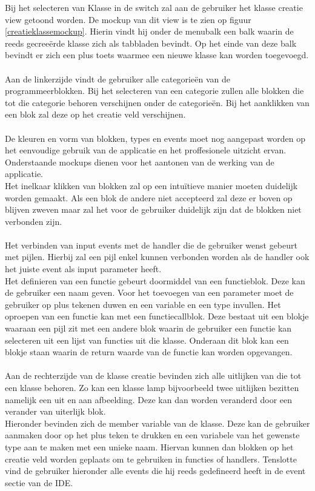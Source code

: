 \documentclass[]{article}
\begin{document}
Bij het selecteren van Klasse in de switch zal aan de gebruiker het klasse creatie view getoond worden. De mockup van dit view is te zien op figuur \ref{creatieklassemockup}. Hierin vindt hij onder de menubalk een balk waarin de reeds gecree\"{e}rde klasse zich als tabbladen bevindt. Op het einde van deze balk bevindt er zich een plus toets waarmee een nieuwe klasse kan worden toegevoegd.\\\\Aan de linkerzijde vindt de gebruiker alle categorie\"{e}n van de programmeerblokken. Bij het selecteren van een categorie zullen alle blokken die tot die categorie behoren verschijnen onder de categorie\"{e}n. Bij het aanklikken van een blok zal deze op het creatie veld verschijnen.\\\\ De kleuren en vorm van blokken, types en events moet nog aangepast worden op het eenvoudige gebruik van de applicatie en het proffesionele uitzicht ervan. Onderstaande mockups dienen voor het aantonen van de werking van de applicatie.\\ Het inelkaar klikken van blokken zal op een intu\"{i}tieve manier moeten duidelijk worden gemaakt. Als een blok de andere niet accepteerd zal deze er boven op blijven zweven maar zal het voor de gebruiker duidelijk zijn dat de blokken niet verbonden zijn.\\\\ Het verbinden van input events met de handler die de gebruiker wenst gebeurt met pijlen. Hierbij zal een pijl enkel kunnen verbonden worden als de handler ook het juiste event als input parameter heeft.\\ Het definieren van een functie gebeurt doormiddel van een functieblok. Deze kan de gebruiker een naam geven. Voor het toevoegen van een parameter moet de gebruiker op plus tekenen duwen en een variable en een type invullen. Het oproepen van een functie kan met een functiecallblok. Deze bestaat uit een blokje waaraan een pijl zit met een andere blok waarin de gebruiker een functie kan selecteren uit een lijst van functies uit die klasse. Onderaan dit blok kan een blokje staan waarin de return waarde van de functie kan worden opgevangen.\\\\ Aan de rechterzijde van de klasse creatie bevinden zich alle uitlijken van die tot een klasse behoren. Zo kan een klasse lamp bijvoorbeeld twee uitlijken bezitten namelijk een uit en aan afbeelding. Deze kan dan worden veranderd door een verander van uiterlijk blok.\\Hieronder bevinden zich de member variable van de klasse. Deze kan de gebruiker aanmaken door op het plus teken te drukken en een variabele van het gewenste type aan te maken met een unieke naam. Hiervan kunnen dan blokken op het creatie veld worden geplaats om te gebruiken in functies of handlers. Tenslotte vind de gebruiker hieronder alle events die hij reeds gedefineerd heeft in de event sectie van de IDE. 
\end{document}
